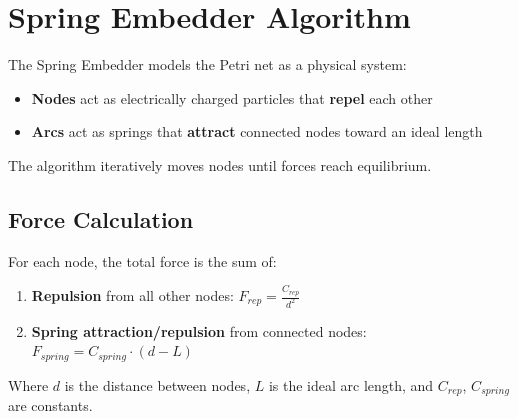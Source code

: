 \section{Spring Embedder Algorithm}
\label{sec:spring-embedder}

The Spring Embedder models the Petri net as a physical system:

\begin{itemize}
    \item \textbf{Nodes} act as electrically charged particles that \textbf{repel} each other
    \item \textbf{Arcs} act as springs that \textbf{attract} connected nodes toward an ideal length
\end{itemize}

The algorithm iteratively moves nodes until forces reach equilibrium.

\subsection{Force Calculation}

For each node, the total force is the sum of:
\begin{enumerate}
    \item \textbf{Repulsion} from all other nodes: $F_{rep} = \frac{C_{rep}}{d^2}$
    \item \textbf{Spring attraction/repulsion} from connected nodes: $F_{spring} = C_{spring} \cdot (d - L)$
\end{enumerate}

Where $d$ is the distance between nodes, $L$ is the ideal arc length, and $C_{rep}$, $C_{spring}$ are constants.

